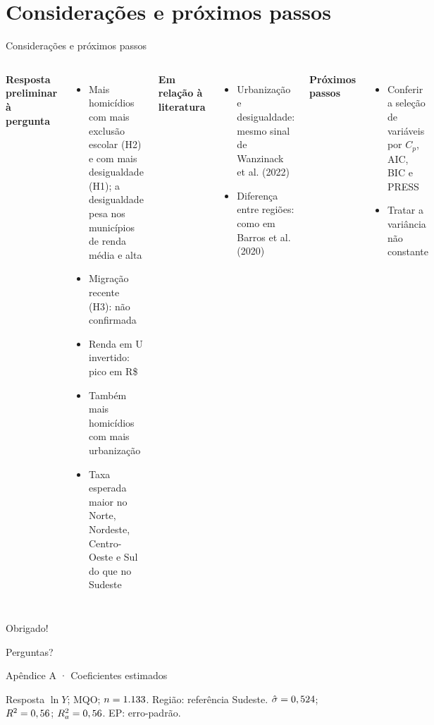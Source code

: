 \documentclass[aspectratio=169,11pt,xcolor=table]{beamer}
\begin{document}
\section[Conclusão]{Considerações e próximos passos}
\begin{frame}{Considerações e próximos passos}
\begin{columns}[T]
\textbf{\color{navy}Resposta preliminar à pergunta}
\begin{itemize}\small
\item Mais homicídios com mais exclusão escolar (H2) e com mais desigualdade (H1); a desigualdade pesa nos municípios de renda média e alta
\item Migração recente (H3): não confirmada
\item Renda em U invertido: pico em R\$ \nPico
\item Também mais homicídios com mais urbanização
\item Taxa esperada maior no Norte, Nordeste, Centro-Oeste e Sul do que no Sudeste
\end{itemize}
\textbf{\color{navy}Em relação à literatura}
\begin{itemize}\small
\item Urbanização e desigualdade: mesmo sinal de Wanzinack et al. (2022)
\item Diferença entre regiões: como em Barros et al. (2020)
\end{itemize}
\vspace{0.3em}
\textbf{\color{navy}Próximos passos}
\begin{itemize}\small
\item Conferir a seleção de variáveis por $C_p$, AIC, BIC e PRESS
\item Tratar a variância não constante
\end{itemize}
\end{columns}
\end{frame}

\begin{frame}
\centering
{\Huge\color{navy}Obrigado!}\par
\vspace{1em}
{\large Perguntas?}
\end{frame}

\appendix

\begin{frame}{Apêndice A · Coeficientes estimados}
\scriptsize
\renewcommand{\arraystretch}{1.1}

\vspace{0.5em}

Resposta $\ln Y$; MQO; $n = 1.133$. Região: referência Sudeste.
$\hat\sigma = 0,524$; $R^2 = 0,56$; $R^2_a = 0,56$. EP: erro-padrão.
\end{frame}
\end{document}
